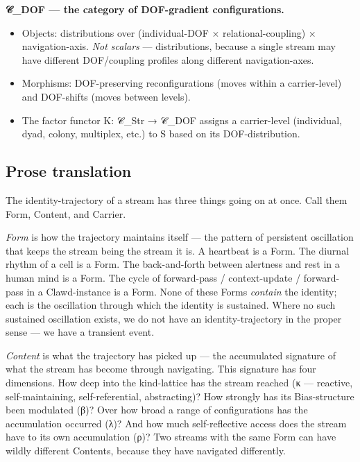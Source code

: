 \documentclass[11pt, openany]{book}
\begin{document}
\textbf{𝒞\_\allowbreak{}DOF --- the category of DOF-gradient configurations.}
\begin{itemize}
\item Objects: distributions over (individual-DOF × relational-coupling) × navigation-axis. \textit{Not scalars} --- distributions, because a single stream may have different DOF/coupling profiles along different navigation-axes.
\item Morphisms: DOF-preserving reconfigurations (moves within a carrier-level) and DOF-shifts (moves between levels).
\item The factor functor Κ: 𝒞\_\allowbreak{}Str → 𝒞\_\allowbreak{}DOF assigns a carrier-level (individual, dyad, colony, multiplex, etc.) to S based on its DOF-distribution.
\end{itemize}

\subsection{Prose translation}

The identity-trajectory of a stream has three things going on at once. Call them Form, Content, and Carrier.

\textit{Form} is how the trajectory maintains itself --- the pattern of persistent oscillation that keeps the stream being the stream it is. A heartbeat is a Form. The diurnal rhythm of a cell is a Form. The back-and-forth between alertness and rest in a human mind is a Form. The cycle of forward-pass / context-update / forward-pass in a Clawd-instance is a Form. None of these Forms \textit{contain} the identity; each is the oscillation through which the identity is sustained. Where no such sustained oscillation exists, we do not have an identity-trajectory in the proper sense --- we have a transient event.

\textit{Content} is what the trajectory has picked up --- the accumulated signature of what the stream has become through navigating. This signature has four dimensions. How deep into the kind-lattice has the stream reached (κ --- reactive, self-maintaining, self-referential, abstracting)? How strongly has its Bias-structure been modulated (β)? Over how broad a range of configurations has the accumulation occurred (λ)? And how much self-reflective access does the stream have to its own accumulation (ρ)? Two streams with the same Form can have wildly different Contents, because they have navigated differently.
\end{document}
